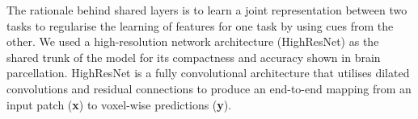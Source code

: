 The rationale behind shared layers is to learn a joint representation between two tasks to regularise the learning of features for one task by using cues from the other. We used a high-resolution network architecture (HighResNet) \cite{li2017compactness} as the shared trunk of the model for its compactness and accuracy shown in brain parcellation. HighResNet is a fully convolutional architecture that utilises dilated convolutions and residual connections to produce an end-to-end mapping from an input patch (\textbf{x}) to voxel-wise predictions (\textbf{y}).  



